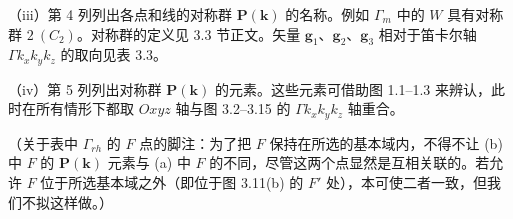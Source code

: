 \noindent（iii）第 4 列列出各点和线的对称群 $\mathbf{P}(\mathbf{k})$ 的名称。例如 $\Gamma_{m}$ 中的 $W$ 具有对称群 $2\ (C_{2})$。对称群的定义见 3.3 节正文。矢量 $\mathbf{g}_{1}$、$\mathbf{g}_{2}$、$\mathbf{g}_{3}$ 相对于笛卡尔轴 $\Gamma k_{x}k_{y}k_{z}$ 的取向见表 3.3。

\noindent（iv）第 5 列列出对称群 $\mathbf{P}(\mathbf{k})$ 的元素。这些元素可借助图 1.1--1.3 来辨认，此时在所有情形下都取 $Oxyz$ 轴与图 3.2--3.15 的 $\Gamma k_{x}k_{y}k_{z}$ 轴重合。

\noindent（关于表中 $\Gamma_{rh}$ 的 $F$ 点的脚注：为了把 $F$ 保持在所选的基本域内，不得不让 (b) 中 $F$ 的 $\mathbf{P}(\mathbf{k})$ 元素与 (a) 中 $F$ 的不同，尽管这两个点显然是互相关联的。若允许 $F$ 位于所选基本域之外（即位于图 3.11(b) 的 $F'$ 处），本可使二者一致，但我们不拟这样做。）
